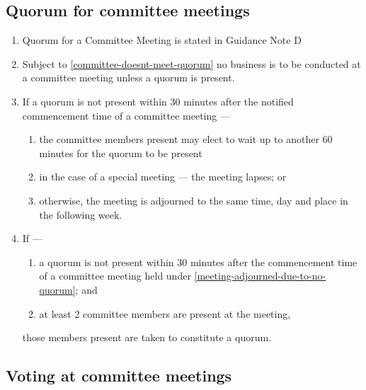 \documentclass[../constitution.tex]{subfiles}
\begin{document}
\hypertarget{quorum-for-committee-meetings}{%
\subsection{Quorum for committee meetings}\label{quorum-for-committee-meetings}}

\begin{enumerate}

\item Quorum for a Committee Meeting is stated in Guidance Note D 
\item Subject to  \ref{committee-doesnt-meet-quorum} no business is to be conducted at a committee meeting unless a quorum is present.
\item If a quorum is not present within 30 minutes after the notified commencement time of a committee meeting --- \label{no-quorum-after-30min}

  \begin{enumerate}
  
  \item the committee members present may elect to wait up to another 60 minutes for the quorum to be present 
  \item in the case of a special meeting --- the meeting lapses; or
  \item otherwise, the meeting is adjourned to the same time, day and place in the following week. \label{meeting-adjourned-due-to-no-quorum}
  \end{enumerate}
\item If ---

  \begin{enumerate}
  
  \item a quorum is not present within 30 minutes after the commencement time of a committee meeting held under  \ref{meeting-adjourned-due-to-no-quorum}; and
  \item at least 2 committee members are present at the meeting,
  \end{enumerate}

  those members present are taken to constitute a quorum.

\end{enumerate}

\hypertarget{voting-at-committee-meetings}{%
\subsection{Voting at committee meetings}\label{voting-at-committee-meetings}}
\end{document}
